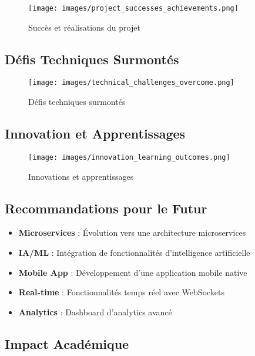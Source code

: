\begin{table}[H]
\begin{table}[H]
\begin{table}[H]
\begin{table}[H]
\begin{table}[H]
\begin{figure}[H]
    \centering
    \texttt{[image: images/project\_successes\_achievements.png]}
    \caption{Succès et réalisations du projet}
    \label{fig:project_successes}
\end{figure}

\subsection{Défis Techniques Surmontés}

\begin{figure}[H]
    \centering
    \texttt{[image: images/technical\_challenges\_overcome.png]}
    \caption{Défis techniques surmontés}
    \label{fig:challenges_overcome}
\end{figure}

\subsection{Innovation et Apprentissages}

\begin{figure}[H]
    \centering
    \texttt{[image: images/innovation\_learning\_outcomes.png]}
    \caption{Innovations et apprentissages}
    \label{fig:innovation_learning}
\end{figure}

\subsection{Recommandations pour le Futur}

\begin{itemize}
    \item \textbf{Microservices} : Évolution vers une architecture microservices
    \item \textbf{IA/ML} : Intégration de fonctionnalités d'intelligence artificielle
    \item \textbf{Mobile App} : Développement d'une application mobile native
    \item \textbf{Real-time} : Fonctionnalités temps réel avec WebSockets
    \item \textbf{Analytics} : Dashboard d'analytics avancé
\end{itemize}

\subsection{Impact Académique}


\end{table}
\end{table}
\end{table}
\end{table}
\end{table}

